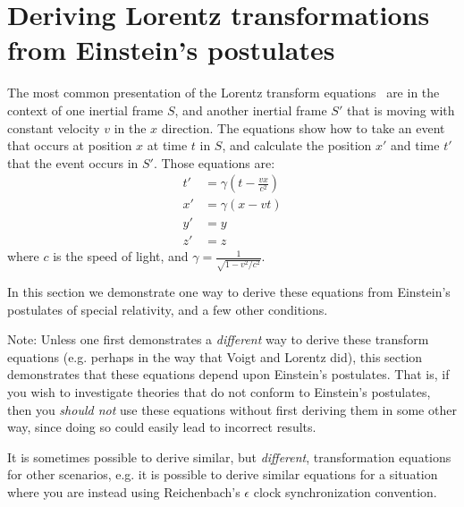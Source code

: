 \documentclass[a4paper]{article}
\theoremstyle{plain}
\theoremstyle{definition}
\begin{document}
\section{Deriving Lorentz transformations from Einstein's postulates}
\label{app:deriving-lorentz-transformations}

The most common presentation of the Lorentz transform
equations~\cite{LorentzTransformation} are in the context of one
inertial frame $S$, and another inertial frame $S'$ that is moving
with constant velocity $v$ in the $x$ direction.
The equations show how to take an event that occurs at position $x$ at
time $t$ in $S$, and calculate the position $x'$ and time $t'$ that
the event occurs in $S'$.
Those equations are:
\begin{align}
t' & = \gamma (t - \frac{vx}{c^2}) \label{eqn:1d-lorentz-transform-t-prime} \\
x' & = \gamma (x - vt) \label{eqn:1d-lorentz-transform-x-prime} \\
y' & = y \label{eqn:1d-lorentz-transform-y-prime} \\
z' & = z \label{eqn:1d-lorentz-transform-z-prime}
\end{align}
where $c$ is the speed of light, and
$\gamma = \frac{1}{\sqrt{1 - v^2/c^2}}$.

In this section we demonstrate one way to derive these equations from
Einstein's postulates of special relativity, and a few other
conditions.

Note: Unless one first demonstrates a {\em different} way to derive
these transform equations (e.g. perhaps in the way that Voigt and
Lorentz did), this section demonstrates that these equations depend
upon Einstein's postulates.  That is, if you wish to investigate
theories that do not conform to Einstein's postulates, then you
{\em should not} use these equations without first deriving them in
some other way, since doing so could easily lead to incorrect results.

It is sometimes possible to derive similar, but {\em different},
transformation equations for other scenarios, e.g. it is possible to
derive similar equations for a situation where you are instead using
Reichenbach's $\epsilon$ clock synchronization convention.

\newcommand{\erp}{\textbf{EP1}}
\newcommand{\esol}{\textbf{EP2}}
\newcommand{\homogeneity}{\textbf{Homogeneity}}
\newcommand{\linearity}{\textbf{Linearity}}
\end{document}
